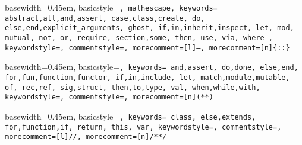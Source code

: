 { basewidth=0.45em,
  basicstyle=\small\tt,  %
  mathescape,
  keywords={
    abstract,all,and,assert,
    case,class,create,
    do,
    else,end,explicit_arguments,
    ghost,
    if,in,inherit,inspect,
    let,
    mod,
    mutual,
    not,
    or,
    require,
    section,some,
    then,
    use,
    via,
    where
  },
  keywordstyle=\color{blue},
  commentstyle=\color{brown},
  morecomment=[l]{--},
  morecomment=[n]{\{:}{:\}}
}

 {\lstset{language=alba}} {}







{ basewidth=0.45em,
  basicstyle=\tt\small,
  keywords={
    and,assert,
    do,done,
    else,end,
    for,fun,function,functor,
    if,in,include,
    let,
    match,module,mutable,
    of,
    rec,ref,
    sig,struct,
    then,to,type,
    val,
    when,while,with},
  keywordstyle=\color{blue},
  commentstyle=\color{brown},
  morecomment=[n]{(*}{*)}
}

 {\lstset{language=ocaml}} {}





{ basewidth=0.45em,
  basicstyle=\small\tt,
  keywords={
    class,
    else,extends,
    for,function,if,
    return,
    this,
    var},
  keywordstyle=\color{blue},
  commentstyle=\color{brown},
  morecomment=[l]{//},
  morecomment=[n]{/*}{*/}
}

 {\lstset{language=js}} {}




\newcommand{\code}[1]{{\tt\small #1}}
\def\Abold{\mathbf{A}}
\def\abold{\mathbf{a}}
\def\Bbold{\mathbf{B}}
\def\bbold{\mathbf{b}}
\def\Cbold{\mathbf{C}}
\def\Dbold{\mathbf{D}}
\def\fbold{\mathbf{f}}
\def\Pbold{\mathbf{P}}
\def\pbold{\mathbf{p}}
\def\qbold{\mathbf{q}}
\def\Tbold{\mathbf{T}}
\def\tbold{\mathbf{t}}
\def\xbold{\mathbf{x}}
\def\ybold{\mathbf{y}}
\def\zbold{\mathbf{z}}


\def\Abstract{{\cal{A}}}
\def\Any{{\cal{U}}}
\def\Boolean  {{\mathbb{B}}}
\def\Decision {{\mathbb{D}}}
\def\List   {{\mathbb{L}}}
\def\Natural{{\mathbb{N}}}
\def\Prop{{\cal{P}}}

\def\max   {\text{max}}
\def\case  {\text{case}}
\def\fix   {\text{fix}}
\def\ind   {\text{ind}}
\def\Inductive    {\mathbb{I}}
\def\Constructor  {\mathbb{C}}

